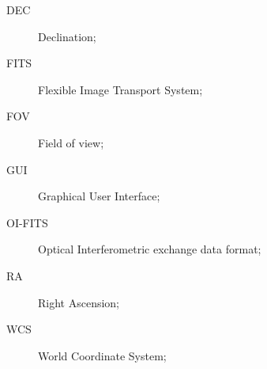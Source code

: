 \documentclass{article}
\begin{document}
\begin{description}
\item[DEC] Declination;
\item[FITS] Flexible Image Transport System;
\item[FOV] Field of view;
\item[GUI] Graphical User Interface;
\item[OI-FITS] Optical Interferometric exchange data format;
\item[RA] Right Ascension;
\item[WCS] World Coordinate System;
\end{description}



\end{document}

